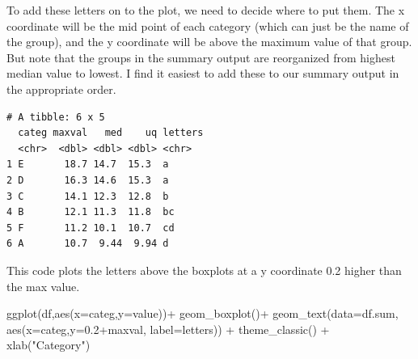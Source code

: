 \documentclass[
  letterpaper,
  DIV=11,
  numbers=noendperiod]{scrreprt}
\newenvironment{Shaded}{\begin{snugshade}}{\end{snugshade}}
\newcommand{\AttributeTok}[1]{\textcolor[rgb]{0.40,0.45,0.13}{#1}}
\newcommand{\DecValTok}[1]{\textcolor[rgb]{0.68,0.00,0.00}{#1}}
\newcommand{\FloatTok}[1]{\textcolor[rgb]{0.68,0.00,0.00}{#1}}
\newcommand{\FunctionTok}[1]{\textcolor[rgb]{0.28,0.35,0.67}{#1}}
\newcommand{\NormalTok}[1]{\textcolor[rgb]{0.00,0.23,0.31}{#1}}
\newcommand{\OtherTok}[1]{\textcolor[rgb]{0.00,0.23,0.31}{#1}}
\newcommand{\SpecialCharTok}[1]{\textcolor[rgb]{0.37,0.37,0.37}{#1}}
\newcommand{\StringTok}[1]{\textcolor[rgb]{0.13,0.47,0.30}{#1}}
\begin{document}
To add these letters on to the plot, we need to decide where to put
them. The x coordinate will be the mid point of each category (which can
just be the name of the group), and the y coordinate will be above the
maximum value of that group. But note that the groups in the summary
output are reorganized from highest median value to lowest. I find it
easiest to add these to our summary output in the appropriate order.

\begin{Shaded}
\end{Shaded}

\begin{verbatim}
# A tibble: 6 x 5
  categ maxval   med    uq letters
  <chr>  <dbl> <dbl> <dbl> <chr>  
1 E       18.7 14.7  15.3  a      
2 D       16.3 14.6  15.3  a      
3 C       14.1 12.3  12.8  b      
4 B       12.1 11.3  11.8  bc     
5 F       11.2 10.1  10.7  cd     
6 A       10.7  9.44  9.94 d      
\end{verbatim}

This code plots the letters above the boxplots at a y coordinate 0.2
higher than the max value.

\begin{Shaded}
\begin{Highlighting}[]
\FunctionTok{ggplot}\NormalTok{(df,}\FunctionTok{aes}\NormalTok{(}\AttributeTok{x=}\NormalTok{categ,}\AttributeTok{y=}\NormalTok{value))}\SpecialCharTok{+}
  \FunctionTok{geom\_boxplot}\NormalTok{()}\SpecialCharTok{+}
  \FunctionTok{geom\_text}\NormalTok{(}\AttributeTok{data=}\NormalTok{df.sum,}
            \FunctionTok{aes}\NormalTok{(}\AttributeTok{x=}\NormalTok{categ,}\AttributeTok{y=}\FloatTok{0.2}\SpecialCharTok{+}\NormalTok{maxval,}
                \AttributeTok{label=}\NormalTok{letters)) }\SpecialCharTok{+}
  \FunctionTok{theme\_classic}\NormalTok{() }\SpecialCharTok{+}
  \FunctionTok{xlab}\NormalTok{(}\StringTok{"Category"}\NormalTok{)}
\end{Highlighting}
\end{Shaded}
\end{document}
